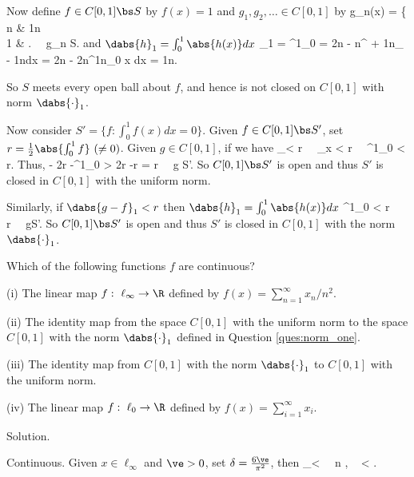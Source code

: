 Now define $f\in C[0,1]\bs S$ by $f(x)=1$ and $g_1, g_2, \dots \in C[0,1]$ by
\be
g_n(x) = \left\{
n \quad\quad & \leq \frac 1n\\
1 & 
\ea\right. \ \ra \ g_n \in S.
\ee
and $\dabs{h}_1 = \int^1_0 \abs{h(x)}dx$
\be
{}_1 = \int^1_0  = \frac 2n - n\int^{ + \frac 1n}_{ - \frac 1n}dx  = \frac 2n - 2n\int^{\frac 1n}_0 x dx = \frac 1n.
\ee

So $S$ meets every open ball about $f$, and hence is not closed on $C[0,1]$ with norm $\dabs{\cdot}_1$.

Now consider $S'= \{f : \int^1_0 f(x)dx = 0\}$. Given $f\in C[0,1]\bs S'$, set $r = \frac 12 \abs{\int^1_0 f} \ (\neq 0)$. Given $g\in C[0,1]$, if we have
\be
{}_\infty < r \ \ra \ \sup_{x\in [0,1]} < r \ \ra \ \int^1_0  < r.
\ee
Thus,
\be
{} \geq {} -  \geq 2r -\int^1_0   > 2r -r = r \ \ra \ g \notin S'.
\ee
So $C[0,1]\bs S'$ is open and thus $S'$ is closed in $C[0,1]$ with the uniform norm.

Similarly, if $\dabs{g-f}_1 < r$ then $\dabs{h}_1 = \int^1_0 \abs{h(x)}dx$
\be
\int^1_0  < r \ \ra \  \geq r \ \ra \ g\notin S'.
\ee
So $C[0,1]\bs S'$ is open and thus $S'$ is closed in $C[0,1]$ with the norm $\dabs{\cdot}_1$.

\begin{exercise}
Which of the following functions $f$ are continuous?
\ben
\item [(i)] The linear map $f :\ \ell_\infty \to \R$ defined by $f(x) = \sum^\infty_{n=1} x_n/n^2$.
\item [(ii)] The identity map from the space $C[0, 1]$ with the uniform norm to the space $C[0, 1]$ with the norm $\dabs{\cdot}_1$ defined in Question \ref{ques:norm_one}.
\item [(iii)] The identity map from $C[0, 1]$ with the norm $\dabs{\cdot}_1$ to $C[0, 1]$ with the uniform norm.
\item [(iv)] The linear map $f :\ \ell_0 \to \R$ defined by $f(x) = \sum^\infty_{i=1} x_i$.
\een
\end{exercise}

Solution. \ben
\item [(i)] Continuous. Given $x\in \ell_\infty$ and $\ve>0$, set $\delta = \frac {6\ve}{\pi^2}$, then 
\be
{}_\infty < \delta \ \ra \ \forall n \in \N, \  < .
\ee

